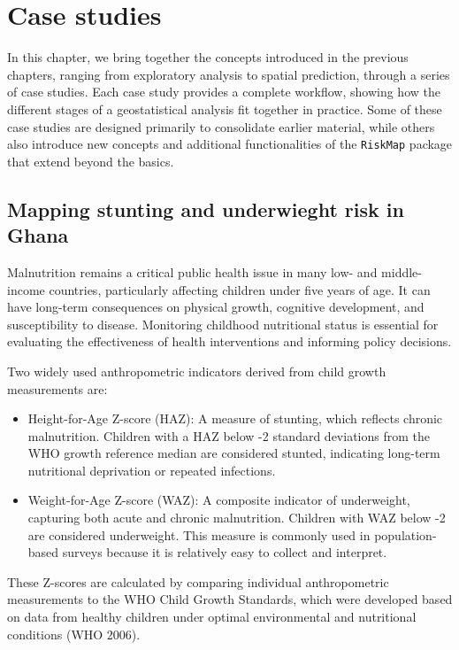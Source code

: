 \documentclass[
  letterpaper,
]{krantz}
\begin{document}

\chapter{Case studies}\label{sec-case-studies}

In this chapter, we bring together the concepts introduced in the
previous chapters, ranging from exploratory analysis to spatial
prediction, through a series of case studies. Each case study provides a
complete workflow, showing how the different stages of a geostatistical
analysis fit together in practice. Some of these case studies are
designed primarily to consolidate earlier material, while others also
introduce new concepts and additional functionalities of the
\texttt{RiskMap} package that extend beyond the basics.

\section{Mapping stunting and underwieght risk in
Ghana}\label{sec-ghana}

Malnutrition remains a critical public health issue in many low- and
middle-income countries, particularly affecting children under five
years of age. It can have long-term consequences on physical growth,
cognitive development, and susceptibility to disease. Monitoring
childhood nutritional status is essential for evaluating the
effectiveness of health interventions and informing policy decisions.

Two widely used anthropometric indicators derived from child growth
measurements are:

\begin{itemize}
\item
  Height-for-Age Z-score (HAZ): A measure of stunting, which reflects
  chronic malnutrition. Children with a HAZ below -2 standard deviations
  from the WHO growth reference median are considered stunted,
  indicating long-term nutritional deprivation or repeated infections.
\item
  Weight-for-Age Z-score (WAZ): A composite indicator of underweight,
  capturing both acute and chronic malnutrition. Children with WAZ below
  -2 are considered underweight. This measure is commonly used in
  population-based surveys because it is relatively easy to collect and
  interpret.
\end{itemize}

These Z-scores are calculated by comparing individual anthropometric
measurements to the WHO Child Growth Standards, which were developed
based on data from healthy children under optimal environmental and
nutritional conditions (WHO 2006).
\end{document}
